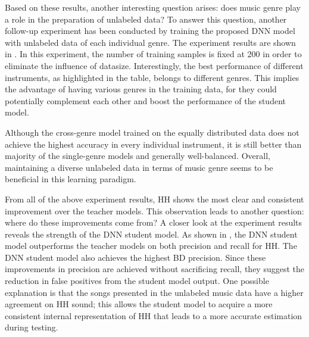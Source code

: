 \documentclass{article}
\begin{document}
Based on these results, another interesting question arises: does music genre play a role in the preparation of unlabeled data? To answer this question, another follow-up experiment has been conducted by training the proposed DNN model with unlabeled data of each individual genre. The experiment results are shown in . In this experiment, the number of training samples is fixed at 200 in order to eliminate the influence of datasize. Interestingly, the best performance of different instruments, as highlighted in the table, belongs to different genres. This implies the advantage of having various genres in the training data, for they could potentially complement each other and boost the performance of the student model. 

Although the cross-genre model trained on the equally distributed data does not achieve the highest accuracy in every individual instrument, it is still better than majority of the single-genre models and generally well-balanced. Overall, maintaining a diverse unlabeled data in terms of music genre seems to be beneficial in this learning paradigm. %
%


From all of the above experiment results, HH shows the most clear and consistent improvement over the teacher models. This observation leads to another question: where do these improvements come from? A closer look at the experiment results reveals the strength of the DNN student model. As shown in , the DNN student model outperforms the teacher models on both precision and recall for HH. The DNN student model also achieves the highest BD precision. Since these improvements in precision are achieved without sacrificing recall, they suggest the reduction in false positives from the student model output. One possible explanation is that the songs presented in the unlabeled music data have a higher agreement on HH sound; this allows the student model to acquire a more consistent internal representation of HH that leads to a more accurate estimation during testing. %
\end{document}
